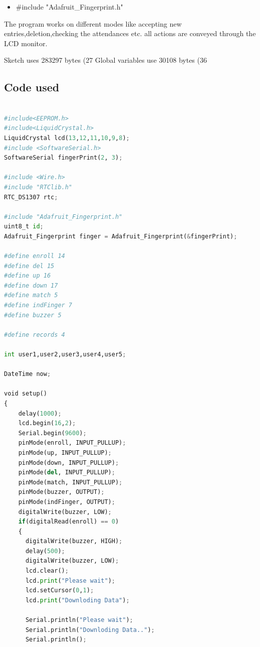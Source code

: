 \documentclass[40pt]{report}
\begin{document}
\begin{itemize}
\begin{itemize}
\item #include "Adafruit_Fingerprint.h"
\end{itemize}
The program works on different modes like accepting new entries,deletion,checking the attendances etc.
all actions are conveyed through the LCD monitor.
 

Sketch uses 283297 bytes (27%
Global variables use 30108 bytes (36%

\subsection{Code used}

\usepackage{listings}
\begin{lstlisting}[language=python ,frame= single]

#include<EEPROM.h>  
#include<LiquidCrystal.h>  
LiquidCrystal lcd(13,12,11,10,9,8);  
#include <SoftwareSerial.h>  
SoftwareSerial fingerPrint(2, 3);  

#include <Wire.h>  
#include "RTClib.h"  
RTC_DS1307 rtc;  

#include "Adafruit_Fingerprint.h"  
uint8_t id; 
Adafruit_Fingerprint finger = Adafruit_Fingerprint(&fingerPrint);  

#define enroll 14  
#define del 15  
#define up 16  
#define down 17  
#define match 5  
#define indFinger 7  
#define buzzer 5  

#define records 4    

int user1,user2,user3,user4,user5;  

DateTime now;  

void setup()  
{
    delay(1000);  
    lcd.begin(16,2);  
    Serial.begin(9600);  
    pinMode(enroll, INPUT_PULLUP);  
    pinMode(up, INPUT_PULLUP);  
    pinMode(down, INPUT_PULLUP);  
    pinMode(del, INPUT_PULLUP);  
    pinMode(match, INPUT_PULLUP);  
    pinMode(buzzer, OUTPUT);  
    pinMode(indFinger, OUTPUT);  
    digitalWrite(buzzer, LOW);  
    if(digitalRead(enroll) == 0)  
    {  
      digitalWrite(buzzer, HIGH);  
      delay(500);  
      digitalWrite(buzzer, LOW);  
      lcd.clear();  
      lcd.print("Please wait");  
      lcd.setCursor(0,1);  
      lcd.print("Downloding Data");  

      Serial.println("Please wait"); 
      Serial.println("Downloding Data..");  
      Serial.println();  


\end{lstlisting}
\end{itemize}
\end{document}

